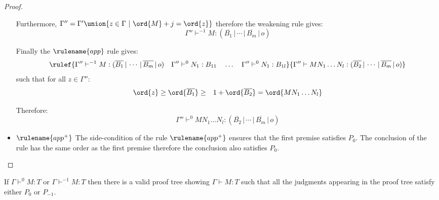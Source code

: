 \begin{proof}
\begin{itemize}
    Furthermore, $\Gamma'' = \Gamma' \union \{ z \in \Gamma \ | \ \ord{M} + j = \ord{z}\}$ therefore
    the weakening rule gives:
    $$\Gamma'' \vdash^{-1} M : (\overline{B_1} \, | \, \cdots \, | \, \overline{B_m} \, | \, o)$$

    Finally the $\rulename{app}$ rule gives:
    $$\rulef{\Gamma'' \vdash^{-1} M : (\overline{B_1} \, | \, \cdots \, | \, \overline{B_m} \, | \, o)
    \quad \Gamma'' \vdash^0 N_1 : B_{11} \quad \ldots \quad \Gamma'' \vdash^0 N_1 : B_{1l}
    }
        { \Gamma'' \vdash M N_1 \ldots N_l : (\overline{B_2} \, | \, \cdots \, | \,
            \overline{B_m} \, | \, o)}
    $$
    such that for all $z\in \Gamma''$:
    \begin{eqnarray*}
    \ord{z} \geq \ord{\overline{B_1}}
    &\geq& 1 + \ord{\overline{B_2}} = \ord{M N_1 \ldots N_l}
    \end{eqnarray*}

    Therefore:
    $$\Gamma'' \vdash^0 M N_1 \ldots N_l : (\overline{B_2} \, | \, \cdots \, | \,
            \overline{B_m} \, | \, o)$$

\item $\rulename{app^+}$  The side-condition of the rule $\rulename{app^+}$ ensures that the first premise
 satisfies $P_0$. The conclusion of the rule has the same order as the first premise
 therefore the conclusion also satisfies $P_0$.
\end{itemize}
\end{proof}


\begin{lemma}
\label{lem:prooftree01only} If $\Gamma \vdash^{0} M : T$ or $\Gamma
\vdash^{-1} M : T$ then there is a valid proof tree showing $\Gamma
\vdash M : T$ such that all the judgments appearing in the proof
tree satisfy either $P_0$ or $P_{-1}$.
\end{lemma}


